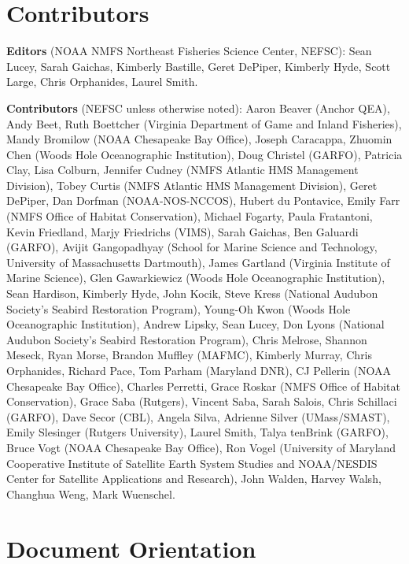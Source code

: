 \documentclass[
  10pt,
]{article}
\begin{document}
\newpage{}

\hypertarget{contributors}{%
\section{Contributors}\label{contributors}}

\textbf{Editors} (NOAA NMFS Northeast Fisheries Science Center, NEFSC): Sean Lucey, Sarah Gaichas, Kimberly Bastille, Geret DePiper, Kimberly Hyde, Scott Large, Chris Orphanides, Laurel Smith.

\textbf{Contributors} (NEFSC unless otherwise noted): Aaron Beaver (Anchor QEA), Andy Beet, Ruth Boettcher (Virginia Department of Game and Inland Fisheries), Mandy Bromilow (NOAA Chesapeake Bay Office), Joseph Caracappa, Zhuomin Chen (Woods Hole Oceanographic Institution), Doug Christel (GARFO), Patricia Clay, Lisa Colburn, Jennifer Cudney (NMFS Atlantic HMS Management Division), Tobey Curtis (NMFS Atlantic HMS Management Division), Geret DePiper, Dan Dorfman (NOAA-NOS-NCCOS), Hubert du Pontavice, Emily Farr (NMFS Office of Habitat Conservation), Michael Fogarty, Paula Fratantoni, Kevin Friedland, Marjy Friedrichs (VIMS), Sarah Gaichas, Ben Galuardi (GARFO), Avijit Gangopadhyay (School for Marine Science and Technology, University of Massachusetts Dartmouth), James Gartland (Virginia Institute of Marine Science), Glen Gawarkiewicz (Woods Hole Oceanographic Institution), Sean Hardison, Kimberly Hyde, John Kocik, Steve Kress (National Audubon Society's Seabird Restoration Program), Young-Oh Kwon (Woods Hole Oceanographic Institution), Andrew Lipsky, Sean Lucey, Don Lyons (National Audubon Society's Seabird Restoration Program), Chris Melrose, Shannon Meseck, Ryan Morse, Brandon Muffley (MAFMC), Kimberly Murray, Chris Orphanides, Richard Pace, Tom Parham (Maryland DNR), CJ Pellerin (NOAA Chesapeake Bay Office), Charles Perretti, Grace Roskar (NMFS Office of Habitat Conservation), Grace Saba (Rutgers), Vincent Saba, Sarah Salois, Chris Schillaci (GARFO), Dave Secor (CBL), Angela Silva, Adrienne Silver (UMass/SMAST), Emily Slesinger (Rutgers University), Laurel Smith, Talya tenBrink (GARFO), Bruce Vogt (NOAA Chesapeake Bay Office), Ron Vogel (University of Maryland Cooperative Institute of Satellite Earth System Studies and NOAA/NESDIS Center for Satellite Applications and Research), John Walden, Harvey Walsh, Changhua Weng, Mark Wuenschel.

\newpage

\hypertarget{document-orientation}{%
\section{Document Orientation}\label{document-orientation}}
\end{document}
